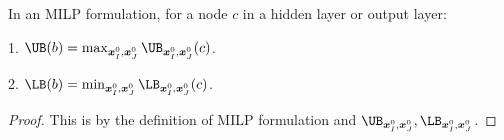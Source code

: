				\begin{lemma} In an MILP formulation, for a node $c$ in a hidden layer or output layer:
					
					1. $\UB(b)=\max_{\boldsymbol{x}^0_I,\boldsymbol{x}^0_J}\UB_{\boldsymbol{x}^0_I,\boldsymbol{x}^0_J}(c)$. 
					
					2. $\LB(b)=\min_{\boldsymbol{x}^0_I,\boldsymbol{x}^0_J}\LB_{\boldsymbol{x}^0_I,\boldsymbol{x}^0_J}(c)$. 
				\end{lemma}
				
				\begin{proof}
					This is by the definition of MILP formulation and $\UB_{\boldsymbol{x}^0_I,\boldsymbol{x}^0_J}, \LB_{\boldsymbol{x}^0_I,\boldsymbol{x}^0_J}$.
				\end{proof}
				
				
